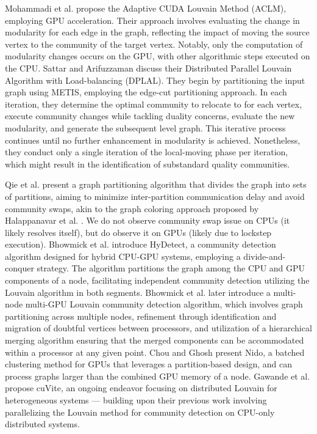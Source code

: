 
Mohammadi et al. \cite{com-mohammadi20} propose the Adaptive CUDA Louvain Method (ACLM), employing GPU acceleration. Their approach involves evaluating the change in modularity for each edge in the graph, reflecting the impact of moving the source vertex to the community of the target vertex. Notably, only the computation of modularity changes occurs on the GPU, with other algorithmic steps executed on the CPU. Sattar and Arifuzzaman \cite{sattar2022scalable} discuss their Distributed Parallel Louvain Algorithm with Load-balancing (DPLAL). They begin by partitioning the input graph using METIS, employing the edge-cut partitioning approach. In each iteration, they determine the optimal community to relocate to for each vertex, execute community changes while tackling duality concerns, evaluate the new modularity, and generate the subsequent level graph. This iterative process continues until no further enhancement in modularity is achieved. Nonetheless, they conduct only a single iteration of the local-moving phase per iteration, which might result in the identification of substandard quality communities. Qie et al. \cite{qie2022isolate} present a graph partitioning algorithm that divides the graph into sets of partitions, aiming to minimize inter-partition communication delay and avoid community swaps, akin to the graph coloring approach proposed by Halappanavar et al. \cite{com-halappanavar17}. We do not observe community swap issue on CPUs (it likely resolves itself), but do observe it on GPUs (likely due to lockstep execution). Bhowmick et al. \cite{com-bhowmik19} introduce HyDetect, a community detection algorithm designed for hybrid CPU-GPU systems, employing a divide-and-conquer strategy. The algorithm partitions the graph among the CPU and GPU components of a node, facilitating independent community detection utilizing the Louvain algorithm in both segments. Bhowmick et al. \cite{com-bhowmick22} later introduce a multi-node multi-GPU Louvain community detection algorithm, which involves graph partitioning across multiple nodes, refinement through identification and migration of doubtful vertices between processors, and utilization of a hierarchical merging algorithm ensuring that the merged components can be accommodated within a processor at any given point. Chou and Ghosh \cite{chou2022batched} present Nido, a batched clustering method for GPUs that leverages a partition-based design, and can process graphs larger than the combined GPU memory of a node. Gawande et al. \cite{com-gawande22} propose cuVite, an ongoing endeavor focusing on distributed Louvain for heterogeneous systems --- building upon their previous work involving parallelizing the Louvain method for community detection on CPU-only distributed systems.

